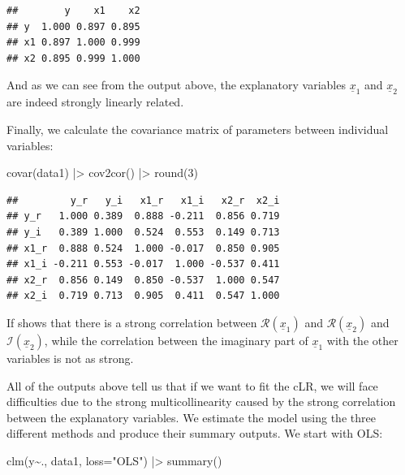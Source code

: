 \documentclass[
]{book}
\newenvironment{Shaded}{\begin{snugshade}}{\end{snugshade}}
\newcommand{\AttributeTok}[1]{\textcolor[rgb]{0.77,0.63,0.00}{#1}}
\newcommand{\DecValTok}[1]{\textcolor[rgb]{0.00,0.00,0.81}{#1}}
\newcommand{\FunctionTok}[1]{\textcolor[rgb]{0.00,0.00,0.00}{#1}}
\newcommand{\NormalTok}[1]{#1}
\newcommand{\SpecialCharTok}[1]{\textcolor[rgb]{0.00,0.00,0.00}{#1}}
\newcommand{\StringTok}[1]{\textcolor[rgb]{0.31,0.60,0.02}{#1}}
\begin{document}
\begin{verbatim}
##        y    x1    x2
## y  1.000 0.897 0.895
## x1 0.897 1.000 0.999
## x2 0.895 0.999 1.000
\end{verbatim}

And as we can see from the output above, the explanatory variables \(\underline{x}_{1}\) and \(\underline{x}_{2}\) are indeed strongly linearly related.

Finally, we calculate the covariance matrix of parameters between individual variables:

\begin{Shaded}
\begin{Highlighting}[]
\FunctionTok{covar}\NormalTok{(data1) }\SpecialCharTok{|\textgreater{}} \FunctionTok{cov2cor}\NormalTok{() }\SpecialCharTok{|\textgreater{}} \FunctionTok{round}\NormalTok{(}\DecValTok{3}\NormalTok{)}
\end{Highlighting}
\end{Shaded}

\begin{verbatim}
##         y_r   y_i   x1_r   x1_i   x2_r  x2_i
## y_r   1.000 0.389  0.888 -0.211  0.856 0.719
## y_i   0.389 1.000  0.524  0.553  0.149 0.713
## x1_r  0.888 0.524  1.000 -0.017  0.850 0.905
## x1_i -0.211 0.553 -0.017  1.000 -0.537 0.411
## x2_r  0.856 0.149  0.850 -0.537  1.000 0.547
## x2_i  0.719 0.713  0.905  0.411  0.547 1.000
\end{verbatim}

If shows that there is a strong correlation between \(\mathcal{R}\left(\underline{x}_{1}\right)\) and \(\mathcal{R}\left(\underline{x}_{2}\right)\) and \(\mathcal{I}\left(\underline{x}_{2}\right)\), while the correlation between the imaginary part of \(\underline{x}_{1}\) with the other variables is not as strong.

All of the outputs above tell us that if we want to fit the cLR, we will face difficulties due to the strong multicollinearity caused by the strong correlation between the explanatory variables. We estimate the model using the three different methods and produce their summary outputs. We start with OLS:

\begin{Shaded}
\begin{Highlighting}[]
\FunctionTok{clm}\NormalTok{(y}\SpecialCharTok{\textasciitilde{}}\NormalTok{., data1, }\AttributeTok{loss=}\StringTok{"OLS"}\NormalTok{) }\SpecialCharTok{|\textgreater{}}
    \FunctionTok{summary}\NormalTok{()}
\end{Highlighting}
\end{Shaded}
\end{document}
